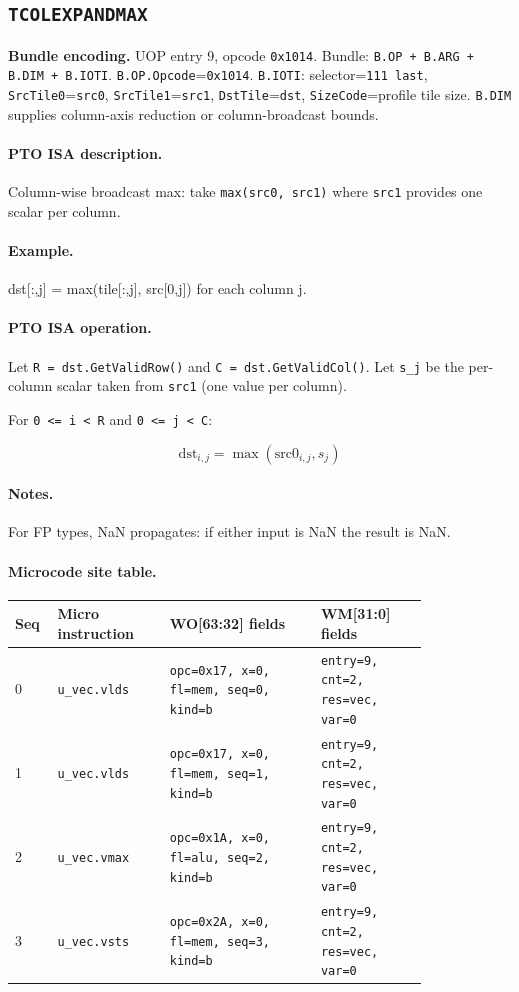 \subsection{\texttt{TCOLEXPANDMAX}}
\noindent\textbf{Bundle encoding.} UOP entry 9, opcode \texttt{0x1014}. Bundle: \texttt{B.OP + B.ARG + B.DIM + B.IOTI}. \texttt{B.OP.Opcode}=\texttt{0x1014}. \texttt{B.IOTI}: selector=\texttt{111 last}, \texttt{SrcTile0}=\texttt{src0}, \texttt{SrcTile1}=\texttt{src1}, \texttt{DstTile}=\texttt{dst}, \texttt{SizeCode}=profile tile size. \texttt{B.DIM} supplies column-axis reduction or column-broadcast bounds.\par\smallskip
{\small
\paragraph{PTO ISA description.}
Column-wise broadcast max: take \texttt{max(src0, src1)} where \texttt{src1} provides one scalar per column.
\paragraph{Example.}
dst[:,j] = max(tile[:,j], src[0,j]) for each column j.
\par\smallskip
\paragraph{PTO ISA operation.}
Let \texttt{R = dst.GetValidRow()} and \texttt{C = dst.GetValidCol()}. Let \texttt{s\_j} be the per-column scalar taken from \texttt{src1} (one value per column).

For \texttt{0 \textless{}= i \textless{} R} and \texttt{0 \textless{}= j \textless{} C}:

\[
\mathrm{dst}_{i,j} = \max(\mathrm{src0}_{i,j}, s_j)
\]
}\par\smallskip
\paragraph{Notes.}
For FP types, NaN propagates: if either input is NaN the result is NaN.
\paragraph{Microcode site table.}
{\scriptsize
\begin{longtable}{@{}R{0.055\linewidth}L{0.23\linewidth}L{0.31\linewidth}L{0.22\linewidth}@{}}
\toprule
Seq & Micro instruction & WO[63:32] fields & WM[31:0] fields \\
 & \texttt{u\_vec.vlds} & \texttt{opc=0x17, x=0, fl=mem, seq=0, kind=b} & \texttt{entry=9, cnt=2, res=vec, var=0} \\
1 & \texttt{u\_vec.vlds} & \texttt{opc=0x17, x=0, fl=mem, seq=1, kind=b} & \texttt{entry=9, cnt=2, res=vec, var=0} \\
2 & \texttt{u\_vec.vmax} & \texttt{opc=0x1A, x=0, fl=alu, seq=2, kind=b} & \texttt{entry=9, cnt=2, res=vec, var=0} \\
3 & \texttt{u\_vec.vsts} & \texttt{opc=0x2A, x=0, fl=mem, seq=3, kind=b} & \texttt{entry=9, cnt=2, res=vec, var=0} \\
\bottomrule
\end{longtable}
}
